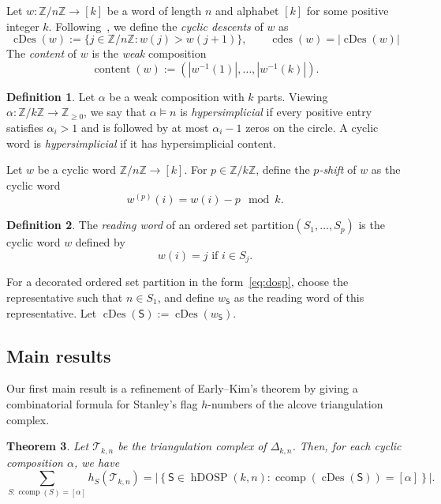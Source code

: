 \documentclass[10pt,a4paper]{amsart}
\theoremstyle{plain}
\newtheorem{theorem}{Theorem}[section]
\theoremstyle{definition}
\newtheorem{definition}[theorem]{Definition}
\newcommand{\Z}{\mathbb{Z}}
\newcommand{\hyp}{\Delta_{k,n}}
\newcommand{\Tri}{\mathcal{T}_{k,n}}
\newcommand{\dosp}{\mathsf{S}}
\DeclareMathOperator{\ccomp}{ccomp}
\DeclareMathOperator{\cDes}{cDes}
\DeclareMathOperator{\hDOSP}{hDOSP}
\DeclareMathOperator{\cdes}{cdes}
\DeclareMathOperator{\content}{content}
\begin{document}
Let $ w:\Z/n\Z \to [k] $ be a word of length $n$ and alphabet $[k]$ for some positive integer $k$.
Following~\cite{magicnumber}, we define the \emph{cyclic descents} of $w$ as
\begin{equation}\label{eq:cdes}
	\cDes(w):=\{j\in\Z/n\Z:w(j)>w(j+1)\},\qquad \cdes(w) = |\cDes(w)|
\end{equation}
The \emph{content} of $ w $
is the \emph{weak} composition
\begin{equation}
	\content(w):= (|w^{-1}(1)|,\dots,|w^{-1}(k)|).
\end{equation}

\begin{definition}\label{def:hypersimplicial}
	Let $\alpha$ be a weak composition with $k$ parts.
	Viewing $\alpha: \Z/k\Z \to \Z_{\geq 0}$, we say that $\alpha \models n$ is \emph{hypersimplicial} if every positive entry satisfies $ \alpha_i > 1 $ and is
	followed by at most $ \alpha_i - 1 $ zeros on the circle.
	A cyclic word is \emph{hypersimplicial} if it has
	hypersimplicial content.
\end{definition}
Let $w$ be a cyclic word $\Z/n\Z \to [k]$. For $ p \in \Z/k\Z $, define the \emph{$p$-shift} of $ w $ as the cyclic word
\begin{equation}\label{eq:pshift}
	w^{(p)}(i) = w(i) - p \mod k.
\end{equation}

\begin{definition}\label{def:reading_word}
	The \emph{reading word} of an ordered set partition$(S_1,\dots,S_p)$ is the cyclic word $ w $ defined by
	\begin{equation}\label{eq:reading-osp}
		w(i)= j \text{ if } i \in S_j.
	\end{equation}
\end{definition}
For a decorated ordered set partition in the form~\eqref{eq:dosp}, choose the representative such that $n \in S_1$, and
define $w_{\dosp}$ as the reading word of this representative. Let $\cDes(\dosp):= \cDes(w_{\dosp})$.

\subsection{Main results}\label{ss:main_results}
Our first main result is a refinement of Early--Kim's theorem by giving a combinatorial formula for Stanley's flag $ h
$-numbers of the alcove triangulation complex.

\begin{theorem}\label{thm:hmain}
	Let $ \Tri $ be the triangulation complex of $ \hyp $.
	Then, for each cyclic composition $ \alpha $, we have
	\begin{equation}
		\sum_{S: \ccomp(S) = [\alpha]} h_S(\Tri) = \left| \left\{ \dosp \in \hDOSP(k,n): \ccomp(\cDes(\dosp)) = [\alpha] \right\}\right|.
	\end{equation}
\end{theorem}
\end{document}
